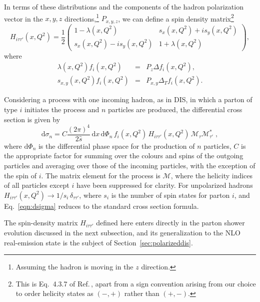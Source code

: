 \documentclass[a4paper,11pt]{article}
\begin{document}
In terms of these distributions and the components of the hadron polarization vector in the $x,y,z$ directions,\footnote{Assuming the hadron is moving in the $z$ direction.} $P_{x,y,z}$,
we can define a spin density matrix\footnote{This is Eq.\ 4.3.7 of Ref.\,\cite{Barone:2001sp}, apart from a sign convention arising from our choice to order helicity states as $(-,+)$ rather than $(+,-)$.}
\begin{equation}
  H_{i\tau\tau'}(x,Q^2) = \frac12 \left( \begin{array}{cc} 1-\lambda(x,Q^2) & s_x(x,Q^2)+is_y(x,Q^2) \\ s_x(x,Q^2)-is_y(x,Q^2) & 1 + \lambda(x,Q^2) \end{array}\right),
\end{equation}
where
\begin{subequations}
  \begin{eqnarray}
    \lambda(x,Q^2) f_i(x,Q^2) &=& P_z \Delta f_i(x,Q^2), \\
    s_{x,y}(x,Q^2) f_i(x,Q^2) &=& P_{x,y} \Delta_T f_i(x,Q^2).
\end{eqnarray}
\end{subequations}

Considering a process with one incoming hadron, as in DIS, in which a parton of type $i$ initiates the process and $n$ particles are produced,
the differential cross section is given by
\begin{equation}
  \mathrm{d}\sigma_n = C \frac{(2\pi)^4}{2\hat{s}}\, \mathrm{d}x\, \mathrm{d}\Phi_n\, f_i(x,Q^2)\, H_{i\tau\tau'}(x,Q^2)\, \mathcal{M}_\tau\mathcal{M}^*_{\tau'}\;,\label{eqn:dsigma}
\end{equation}
where $\mathrm{d}\Phi_n$ is the differential phase space for the production of $n$ particles,
$C$ is the appropriate factor for summing over the colours and spins of the outgoing particles and averaging over those of the incoming particles, with the
exception of the spin of $i$. The matrix element for the process is $\mathcal{M}$, where the helicity indices of
all particles except $i$ have been suppressed for clarity. For unpolarized hadrons $H_{i\tau\tau'}(x,Q^2)\to 1/s_i\,\delta_{\tau\tau'}$, where $s_i$ is the number of spin states for parton $i$, and
Eq.~\eqref{eqn:dsigma} reduces to the standard cross section formula.

The spin-density matrix $H_{i\tau\tau'}$ defined here enters directly in the parton shower evolution discussed in the next subsection, and its generalization to the NLO real-emission state is the subject of Section~\ref{sec:polarizeddis}.
\end{document}
